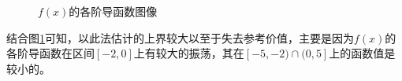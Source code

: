 \documentclass[11pt]{article}
\begin{document}
\begin{figure}[H]
    \centering
    \quad

    \caption{$f(x)$的各阶导函数图像}
    \label{Derivative_curves}
\end{figure}
结合图\ref{Derivative_curves}可知，以此法估计的上界较大以至于失去参考价值，主要是因为$f(x)$的各阶导函数在区间$[-2, 0]$上有较大的振荡，其在$[-5, -2) \cap (0, 5]$上的函数值是较小的。
\end{document}
